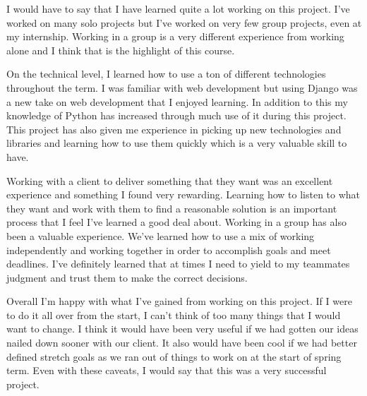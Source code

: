 I would have to say that I have learned quite a lot working on this project.
I've worked on many solo projects but I've worked on very few group projects, even at my internship.
Working in a group is a very different experience from working alone and I think that is the highlight of this course.

On the technical level, I learned how to use a ton of different technologies throughout the term.
I was familiar with web development but using Django was a new take on web development that I enjoyed learning.
In addition to this my knowledge of Python has increased through much use of it during this project.
This project has also given me experience in picking up new technologies and libraries and learning how to use them quickly which is a very valuable skill to have.

Working with a client to deliver something that they want was an excellent experience and something I found very rewarding.
Learning how to listen to what they want and work with them to find a reasonable solution is an important process that I feel I've learned a good deal about.
Working in a group has also been a valuable experience.
We've learned how to use a mix of working independently and working together in order to accomplish goals and meet deadlines.
I've definitely learned that at times I need to yield to my teammates judgment and trust them to make the correct decisions.

Overall I'm happy with what I've gained from working on this project.
If I were to do it all over from the start, I can't think of too many things that I would want to change.
I think it would have been very useful if we had gotten our ideas nailed down sooner with our client.
It also would have been cool if we had better defined stretch goals as we ran out of things to work on at the start of spring term.
Even with these caveats, I would say that this was a very successful project.